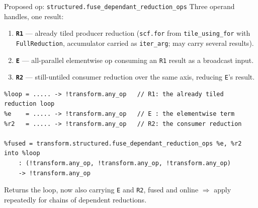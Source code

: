 \documentclass[10pt, aspectratio=169]{beamer}
\newcommand{\code}[1]{\texttt{\small #1}}
\begin{document}
\begin{frame}[fragile]{Proposed op: \code{structured.fuse\_dependant\_reduction\_ops}}
  Three operand handles, one result:
  \begin{enumerate}\small
    \item \textbf{\code{R1}} --- already tiled producer reduction
      (\code{scf.for} from \code{tile\_using\_for} with \code{FullReduction},
      accumulator carried as \code{iter\_arg}; may carry several results).
    \item \textbf{\code{E}} --- all-parallel elementwise op consuming an \code{R1}
      result as a broadcast input.
    \item \textbf{\code{R2}} --- still-untiled consumer reduction over the same
      axis, reducing \code{E}'s result.
  \end{enumerate}
  \vspace{1mm}
\begin{lstlisting}
%loop = ..... -> !transform.any_op   // R1: the already tiled reduction loop
%e    = ..... -> !transform.any_op   // E : the elementwise term
%r2   = ..... -> !transform.any_op   // R2: the consumer reduction

%fused = transform.structured.fuse_dependant_reduction_ops %e, %r2 into %loop
    : (!transform.any_op, !transform.any_op, !transform.any_op)
    -> !transform.any_op
\end{lstlisting}
  \vspace{1mm}
  \small Returns the loop, now also carrying \code{E} and \code{R2}, fused and
  online $\Rightarrow$ \alert{apply repeatedly} for chains of dependent reductions.
\end{frame}
\end{document}
